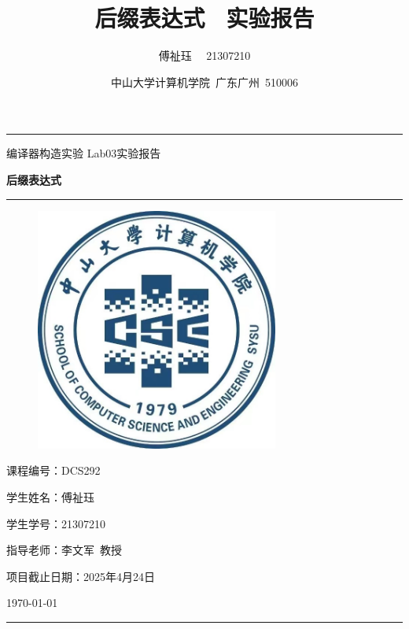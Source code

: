 \documentclass[a4paper, twoside, utf8]{ctexart}
\title{\songti \bfseries 后缀表达式 \ 实验报告}
\author{\fangsong 傅祉珏 \ \ 21307210}
\date{\fangsong 中山大学计算机学院\ 广东广州\ 510006}
\begin{document}
	
	\begin{titlepage}
		\centering
		\rule{\textwidth}{1pt}
		\vspace{0.02\textheight}
		
		{\LARGE \kaishu 编译器构造实验 \quad Lab03实验报告}
		
		\vspace{0.02\textheight}
		
		{\Huge \songti \bfseries 后缀表达式}
		
        \vspace{0.025\textheight}
        \rule{0.83\textwidth}{0.4pt}
        \vspace{0.05\textheight} 
        
        \begin{figure}[htbp]
            \centering
            \includegraphics[width=8cm, height=8cm]{./figure/计院院徽.jpg}
        \end{figure}

        \vspace{0.05\textheight} 
        {\Large 课程编号：\textsc{DCS292}}

        \vspace{0.025\textheight} 
        {\Large 学生姓名：\textsc{傅祉珏}}

        \vspace{0.025\textheight} 
        {\Large 学生学号：\textsc{21307210}}

        \vspace{0.025\textheight} 
        {\Large 指导老师：\textsc{李文军\ 教授}}
 
        \vspace{0.025\textheight} 
        {\Large 项目截止日期：\textsc{2025年4月24日}}

        \vspace{0.05\textheight} 
        \vfill

        {\large \today}
        \vspace{0.1\textheight}
        \rule{\textwidth}{1pt}
    \end{titlepage}
	
\end{document}
